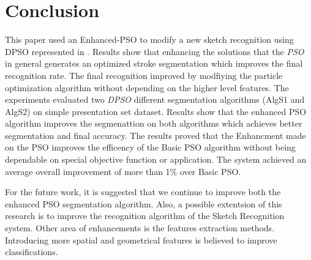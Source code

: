 \documentclass[10pt]{article}
\begin{document}
 
  
\section{Conclusion }
 \label{ConclusionandFutureWork}


This paper used an  Enhanced-PSO  to modify a new sketch recognition using DPSO represented in \cite{mypaper}. Results show that enhancing the solutions that the \textit{PSO} in general generates an optimized stroke segmentation which improves the final recognition rate.  The final recognition improved by modfiying the particle optimization algorithm without depending on the higher level features. The experiments evaluated two \textit{DPSO} different segmentation algorithms (AlgS1 and AlgS2) on simple presentation set dataset. Results show that the enhanced PSO algorithm improves the segmenattion on both algorithms which achieves better segmentation and final accuracy. The results proved that the Enhancment made on the PSO improves the efficency of the Basic PSO algorithm without being dependable on special objective function or application. The system achieved an average overall improvement of more than 1\% over Basic PSO.  

 For the future work, it is suggested that we continue to improve both the enhanced PSO segmentation algorithm. Also, a possible extentsion of this research is to improve the recognition algorithm of the Sketch Recognition system. Other area of enhancements is the features extraction methods. Introducing more spatial and geometrical features is believed to improve classifications.   %





\end{document}
